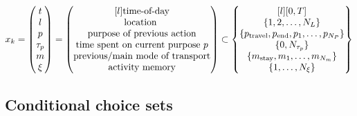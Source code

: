 \begin{equation}
    x_k = \begin{pmatrix}
    t \\
    l \\
    p \\
    \atime_p\\
    m \\
    \amem
    \end{pmatrix} =
    \begin{pmatrix*}[l]
    \text{time-of-day} \\
    \text{location } \\
    \text{purpose of previous action} \\
    \text{time spent on current purpose $p$} \\
    \text{previous/main mode of transport} \\
    \text{activity memory} \\
    \end{pmatrix*}
    \subset
    \begin{Bmatrix*}[l]
    [0,T] \\
    \{1,2,\dots, N_L\} \\
    \{p_{\text{travel}},p_{\text{end}},p_1,\dots,p_{N_P}\} \\
    \{0,N_{\atime_p}\} \\
    \{m_{\text{stay}},m_1,\dots,m_{N_m}\} \\
    \{ 1,\dots,N_\amem \} 
    \end{Bmatrix*}
\end{equation}

\subsection{Conditional choice sets}


